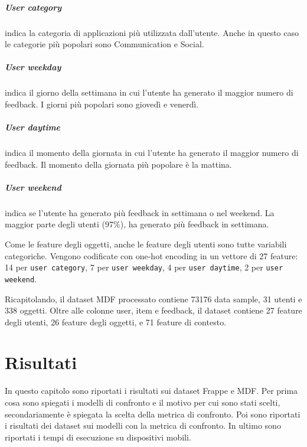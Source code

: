 \documentclass[12pt,italian]{report}
\begin{document}
\paragraph{User category} indica la categoria di applicazioni più utilizzata dall'utente. Anche in questo caso le categorie più popolari sono Communication e Social.

\paragraph{User weekday} indica il giorno della settimana in cui l'utente ha generato il maggior numero di feedback. I giorni più popolari sono giovedì e venerdì.

\paragraph{User daytime} indica il momento della giornata in cui l'utente ha generato il maggior numero di feedback. Il momento della giornata più popolare è la mattina.

\paragraph{User weekend} indica se l'utente ha generato più feedback in settimana o nel weekend. La maggior parte degli utenti (97\%), ha generato più feedback in settimana.

\bigskip \noindent
Come le feature degli oggetti, anche le feature degli utenti sono tutte variabili categoriche. Vengono codificate con one-hot encoding in un vettore di 27 feature: 14 per \texttt{user category}, 7 per \texttt{user weekday}, 4 per \texttt{user daytime}, 2 per \texttt{user weekend}.

Ricapitolando, il dataset MDF processato contiene 73176 data sample, 31 utenti e 338 oggetti. Oltre alle colonne user, item e feedback, il dataset contiene  27 feature degli utenti, 26 feature degli oggetti, e 71 feature di contesto.


% 
% 

\chapter{Risultati} \label{chap:risultati}
In questo capitolo sono riportati i risultati sui dataset Frappe e MDF. Per prima cosa sono spiegati i modelli di confronto e il motivo per cui sono stati scelti, secondariamente è spiegata la scelta della metrica di confronto. Poi sono riportati i risultati dei dataset sui modelli con la metrica di confronto. In ultimo sono riportati i tempi di esecuzione su dispositivi mobili.
\end{document}
